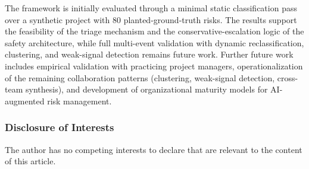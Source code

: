 \documentclass[runningheads]{llncs}
\begin{document}
The framework is initially evaluated through a minimal static classification pass over a synthetic project with 80 planted-ground-truth risks. The results support the feasibility of the triage mechanism and the conservative-escalation logic of the safety architecture, while full multi-event validation with dynamic reclassification, clustering, and weak-signal detection remains future work. Further future work includes empirical validation with practicing project managers, operationalization of the remaining collaboration patterns (clustering, weak-signal detection, cross-team synthesis), and development of organizational maturity models for AI-augmented risk management.

\begin{credits}
\subsubsection{Disclosure of Interests}
The author has no competing interests to declare that are relevant to the content of this article.
\end{credits}
\end{document}
